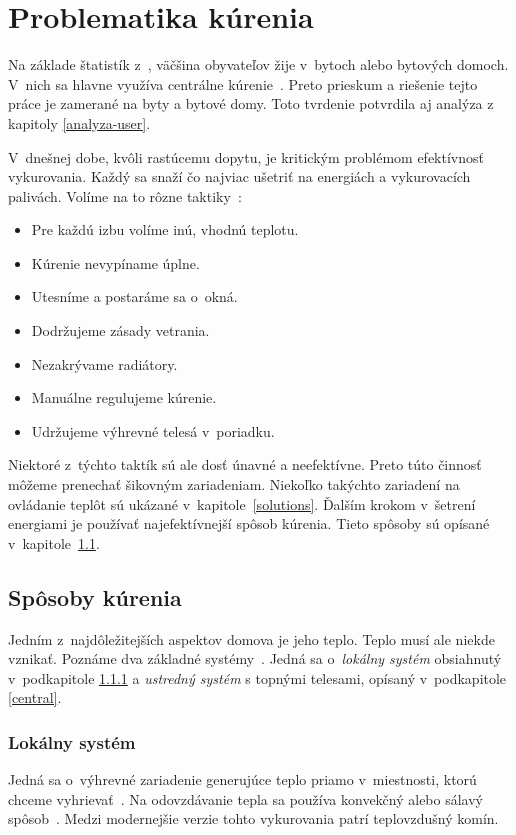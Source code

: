 \chapter{Problematika kúrenia}\label{kur}
Na základe štatistík z~\cite{scitanie_2021}, väčšina obyvateľov žije v~bytoch alebo bytových domoch. 
V~nich sa hlavne využíva centrálne kúrenie~\cite{kurenie_byt}. 
Preto prieskum a riešenie tejto práce je zamerané na byty a bytové domy.
Toto tvrdenie potvrdila aj analýza z kapitoly \ref{analyza-user}.

V~dnešnej dobe, kvôli rastúcemu dopytu, je kritickým problémom efektívnosť vykurovania. 
Každý sa snaží čo najviac ušetriť na energiách a vykurovacích palivách. 
Volíme na to rôzne taktiky~\cite{triky_kurenia_2020}:
\begin{itemize}
    \item Pre každú izbu volíme inú, vhodnú teplotu.
    \item Kúrenie nevypíname úplne.
    \item Utesníme a postaráme sa o~okná.
    \item Dodržujeme zásady vetrania.
    \item Nezakrývame radiátory.
    \item Manuálne regulujeme kúrenie.
    \item Udržujeme výhrevné telesá v~poriadku.
\end{itemize}
Niektoré z~týchto taktík sú ale dosť únavné a neefektívne.
Preto túto činnosť môžeme prenechať šikovným zariadeniam. 
Niekoľko takýchto zariadení na ovládanie teplôt sú ukázané v~kapitole~\ref{solutions}. 
Ďalším krokom v~šetrení energiami je používať najefektívnejší spôsob kúrenia. 
Tieto spôsoby sú opísané v~kapitole~\ref{heating}.


\section{Spôsoby kúrenia}\label{heating}
Jedním z~najdôležitejších aspektov domova je jeho teplo. 
Teplo musí ale niekde vznikať. 
Poznáme dva základné systémy~\cite{kubba2012handbook}. 
Jedná sa o~\emph{lokálny systém} obsiahnutý v~podkapitole \ref{local} a \emph{ustredný systém} s topnými telesami, opísaný v~podkapitole \ref{central}.

\subsection{Lokálny systém}\label{local}
Jedná sa o~výhrevné zariadenie generujúce teplo priamo v~miestnosti, ktorú chceme vyhrievať~\cite{purkynve1891topeni}. 
Na odovzdávanie tepla sa používa konvekčný alebo sálavý spôsob~\cite{lokal}.
Medzi modernejšie verzie tohto vykurovania patrí teplovzdušný komín.

